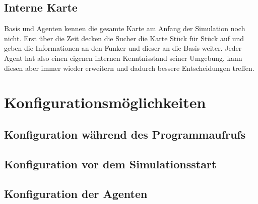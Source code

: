 \documentclass{scrartcl}
\begin{document}
\subsection{Interne Karte}
Basis und Agenten kennen die gesamte Karte am Anfang der Simulation noch nicht. Erst über die Zeit decken die Sucher die Karte Stück für Stück auf und geben die Informationen an den Funker und dieser an die Basis weiter.
Jeder Agent hat also einen eigenen internen Kenntnisstand seiner Umgebung, kann diesen aber immer wieder erweitern und dadurch bessere Entscheidungen treffen.
\section{Konfigurationsmöglichkeiten}
\subsection{Konfiguration während des Programmaufrufs}
\subsection{Konfiguration vor dem Simulationsstart}
\subsection{Konfiguration der Agenten}
\end{document}
